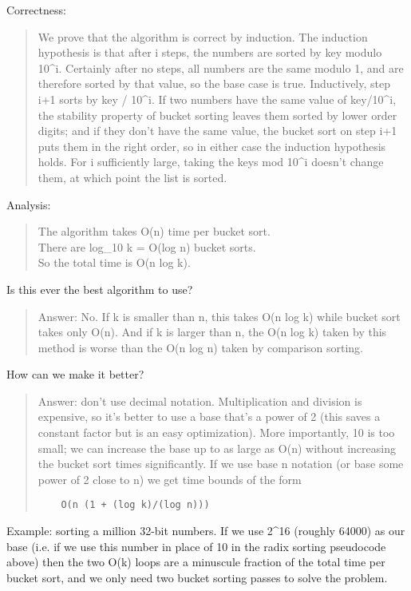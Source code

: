 \documentclass[a4paper,11pt]{article}
\begin{document}
Correctness:
\begin{quotation}We prove that the algorithm is correct by induction.
  The induction hypothesis is that after i steps, the numbers are
  sorted by key modulo 10\textasciicircum{}i. Certainly after no
  steps, all numbers are the same modulo 1, and are therefore sorted
  by that value, so the base case is true. Inductively, step i+1 sorts
  by key / 10\textasciicircum{}i.  If two numbers have the same value
  of key/10\textasciicircum{}i, the stability property of bucket
  sorting leaves them sorted by lower order digits; and if they don't
  have the same value, the bucket sort on step i+1 puts them in the
  right order, so in either case the induction hypothesis holds. For i
  sufficiently large, taking the keys mod 10\textasciicircum{}i
  doesn't change them, at which point the list is sorted.
\end{quotation}

Analysis:
\begin{quotation}The algorithm takes O(n) time per bucket sort.
  \\
  There are log\_10 k = O(log n) bucket sorts.
  \\
  So the total time is O(n log k).
\end{quotation}

Is this ever the best algorithm to use?
\begin{quotation}Answer: No. If k is smaller than n, this takes O(n
  log k) while bucket sort takes only O(n). And if k is larger than n,
  the O(n log k) taken by this method is worse than the O(n log n)
  taken by comparison sorting.
\end{quotation}

How can we make it better?
\begin{quotation}Answer: don't use decimal notation. Multiplication
  and division is expensive, so it's better to use a base that's a
  power of 2 (this saves a constant factor but is an easy
  optimization).  More importantly, 10 is too small; we can increase
  the base up to as large as O(n) without increasing the bucket sort
  times significantly. If we use base n notation (or base some power
  of 2 close to n) we get time bounds of the form

\begin{verbatim}
    O(n (1 + (log k)/(log n)))
\end{verbatim}
\end{quotation}

Example: sorting a million 32-bit numbers. If we use
2\textasciicircum{}16 (roughly 64000) as our base (i.e. if we use this
number in place of 10 in the radix sorting pseudocode above) then the
two O(k) loops are a minuscule fraction of the total time per bucket
sort, and we only need two bucket sorting passes to solve the problem.
\end{document}
